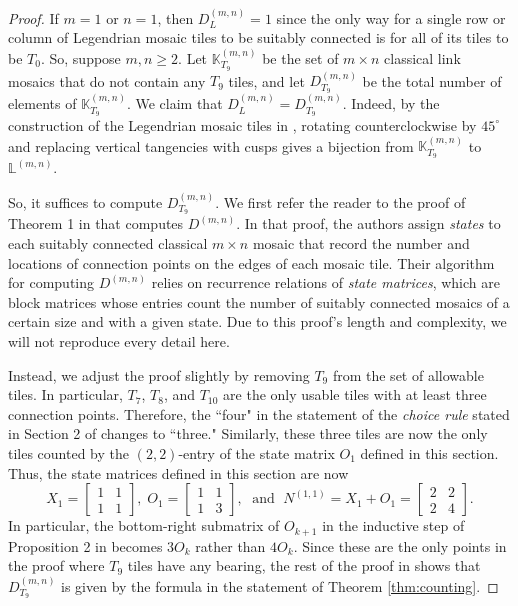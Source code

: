 \documentclass{article}
\begin{document}
\begin{proof}
    If $m=1$ or $n=1$, then $D_L^{(m,n)}=1$ since the only way for a single row or column of Legendrian mosaic tiles to be suitably connected is for all of its tiles to be $T_0$. So, suppose $m,n\geq 2$. Let $\mathbb{K}_{T_9}^{(m,n)}$ be the set of $m\times n$ classical link mosaics that do not contain any $T_9$ tiles, and let $D^{(m,n)}_{T_9}$ be the total number of elements of $\mathbb{K}_{T_9}^{(m,n)}$.
    We claim that $D_L^{(m,n)}=D^{(m,n)}_{T_9}$.
    Indeed, by the construction of the Legendrian mosaic tiles in \cite{pezzimenti}, rotating counterclockwise by $45^\circ$ and replacing vertical tangencies with cusps gives a bijection from $\mathbb{K}_{T_9}^{(m,n)}$ to $\mathbb{L}^{(m,n)}$.  
    
    So, it suffices to compute $D^{(m,n)}_{T_9}$. We first refer the reader to the proof of Theorem 1 in \cite{mosaic-count} that computes $D^{(m,n)}$.
    In that proof, the authors assign \emph{states} to each suitably connected classical $m\times n$ mosaic that record the number and locations of connection points on the edges of each mosaic tile. Their algorithm for computing $D^{(m,n)}$ relies on recurrence relations of \emph{state matrices}, which are block matrices whose entries count the number of suitably connected mosaics of a certain size and with a given state. Due to this proof's length and complexity, we will not reproduce every detail here.
    
    Instead, we adjust the proof slightly by removing $T_9$ from the set of allowable tiles. In particular, $T_7$, $T_8$, and $T_{10}$ are the only usable tiles with at least three connection points. Therefore, the ``four" in the statement of the \emph{choice rule} stated in Section 2 of \cite{mosaic-count} changes to ``three." Similarly, these three tiles are now the only tiles counted by the $(2,2)$-entry of the state matrix $O_1$ defined in this section. Thus, the state matrices defined in this section are now
    \[
    X_{1}=\begin{bmatrix}
        1 & 1 \\ 1 & 1
    \end{bmatrix},\; O_{1}=\begin{bmatrix}
        1 & 1 \\ 1 & 3
    \end{bmatrix},\;  \text{ and }\; N^{(1,1)}=X_1 + O_1=\begin{bmatrix}
        2 & 2 \\ 2 & 4 \end{bmatrix}.
    \]
    In particular, the bottom-right submatrix of $O_{k+1}$ in the inductive step of Proposition 2 in \cite{mosaic-count} becomes $3O_k$ rather than $4O_k$. Since these are the only points in the proof where $T_9$ tiles have any bearing, the rest of the  proof in \cite{mosaic-count} shows that $D^{(m,n)}_{T_9}$ is given by the formula in the statement of Theorem \ref{thm:counting}.
\end{proof}
\end{document}
